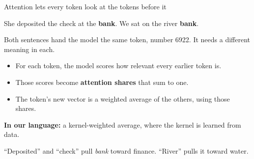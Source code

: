 \documentclass[aspectratio=169,11pt]{beamer}
\begin{document}
\begin{frame}{Attention lets every token look at the tokens before it}

\begin{center}
{\large She deposited the check at the \textcolor{mitcardinal}{\textbf{bank}}. \qquad We sat on the river \textcolor{mitcardinal}{\textbf{bank}}.}
\end{center}

\vspace{0.3cm}

Both sentences hand the model the same token, number 6922. It needs a different meaning in each.

\vspace{0.25cm}

\begin{itemize}\setlength\itemsep{0.3em}
    \item For each token, the model scores how relevant every earlier token is.
    \item Those scores become \textbf{attention shares} that sum to one.
    \item The token's new vector is a weighted average of the others, using those shares.
\end{itemize}

\vspace{0.25cm}

\textbf{In our language:} a kernel-weighted average, where the kernel is learned from data.

\vspace{0.25cm}

\alert{``Deposited'' and ``check'' pull \emph{bank} toward finance. ``River'' pulls it toward water.}

\end{frame}
\end{document}
